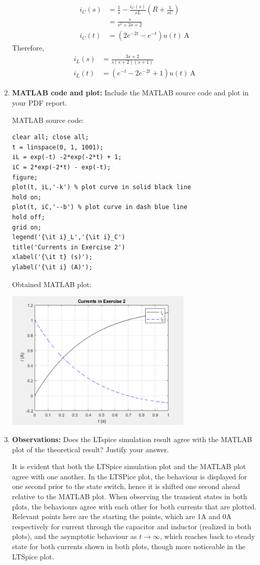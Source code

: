 \documentclass[10pt, letterpaper]{article}
\begin{document}
\begin{enumerate}
\begin{align*}
   i_C(s) &=  \frac{1}{s} - \frac{i_C(s)}{sL}(R+\frac{1}{sC}) \\
          &= \frac{s}{s^2 + 3s + 2} \\
  i_C(t) &= (2 e^{-2t} - e^{-t}) u(t)\ \text{A}
\end{align*}
Therefore, 
\begin{align*}
    i_L(s) &= \frac{3s+2}{s(s+2)(s+1)} \\
    i_L(t) &= (e^{-t} -2e^{-2t} + 1)u(t) \ \text{A}
\end{align*}
\item \textbf{MATLAB code and plot: }Include the MATLAB source code and plot in your PDF report.

MATLAB source code: 
\begin{lstlisting}
clear all; close all;
t = linspace(0, 1, 1001);
iL = exp(-t) -2*exp(-2*t) + 1;
iC = 2*exp(-2*t) - exp(-t);
figure;
plot(t, iL,'-k') % plot curve in solid black line
hold on;
plot(t, iC,'--b') % plot curve in dash blue line
hold off;
grid on;
legend('{\it i}_L','{\it i}_C')
title('Currents in Exercise 2')
xlabel('{\it t} (s)');
ylabel('{\it i} (A)');
\end{lstlisting}
Obtained MATLAB plot: 
\begin{center}
    \includegraphics[width=0.7\textwidth]{images/ml2.png}
\end{center}
\newpage
\item \textbf{Observations: }Does the LTspice simulation result agree with the MATLAB plot of the theoretical result? Justify
your answer.

It is evident that both the LTSpice simulation plot and the MATLAB plot agree with one another. In the LTSPice plot, the behaviour is displayed for one second prior to the state switch, hence it is shifted one second ahead relative to the MATLAB plot. When observing the transient states in both plots, the behaviours agree with each other for both currents that are plotted. Relevant points here are the starting the points, which are 1A and 0A respectively for current through the capacitor and inductor (realized in both plots), and the asymptotic behaviour as $t \rightarrow \infty$, which reaches back to steady state for both currents shown in both plots, though more noticeable in the LTSpice plot.
\end{enumerate}
\end{document}
